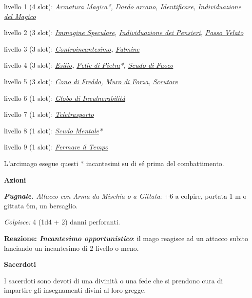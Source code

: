 \begin{multicols}{2}
{livello 1 (4 slot): \emph{\hyperlink{Armatura Magica}{Armatura Magica}*, \hyperlink{Dardo arcano}{Dardo arcano}, \hyperlink{Identificare}{Identificare}, \hyperlink{Individuazione del Magico}{Individuazione del Magico}}

livello 2 (3 slot): \emph{\hyperlink{Immagine Speculare}{Immagine Speculare}, \hyperlink{Individuazione dei Pensieri}{Individuazione dei Pensieri}, \hyperlink{Passo Velato}{Passo Velato}}

livello 3 (3 slot): \emph{\hyperlink{Controincantesimo}{Controincantesimo}, \hyperlink{Fulmine}{Fulmine}}

livello 4 (3 slot): \emph{\hyperlink{Esilio}{Esilio}, \hyperlink{Pelle di Pietra}{Pelle di Pietra}*, \hyperlink{Scudo di Fuoco}{Scudo di Fuoco}}

livello 5 (3 slot): \emph{\hyperlink{Cono di Freddo}{Cono di Freddo}, \hyperlink{Muro di Forza}{Muro di Forza}, \hyperlink{Scrutare}{Scrutare}}

livello 6 (1 slot): \emph{\hyperlink{Globo di Invulnerabilità}{Globo di Invulnerabilità}}

livello 7 (1 slot): \emph{\hyperlink{Teletrasporto}{Teletrasporto}}

livello 8 (1 slot): \emph{\hyperlink{Scudo Mentale}{Scudo Mentale}*}

livello 9 (1 slot): \emph{\hyperlink{Fermare il Tempo}{Fermare il Tempo}}

L'arcimago esegue questi {*} incantesimi su di sé prima del combattimento.

\textbf{Azioni}

\emph{\textbf{Pugnale.} Attacco con Arma da Mischia o a Gittata}: +6 a colpire, portata 1 m o gittata 6m, un bersaglio.

\emph{Colpisce:} 4 (1d4 + 2) danni perforanti.

\textbf{Reazione: \emph{Incantesimo opportunistico}}: il mago reagisce ad un attacco subito lanciando un incantesimo di 2 livello o meno.

\medskip\textbf{Sacerdoti}

I sacerdoti sono devoti di una divinità o una fede che si prendono cura di impartire gli insegnamenti divini al loro gregge.

}
\end{multicols}
